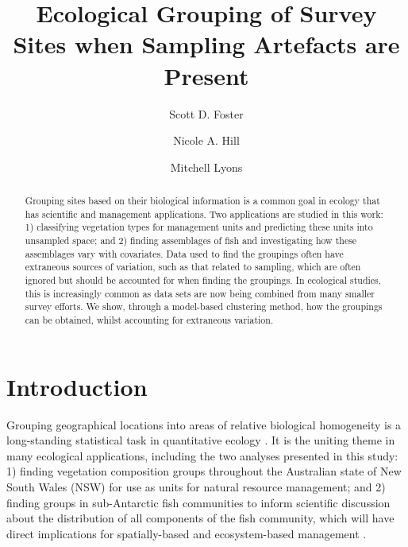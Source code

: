 \documentclass{statsoc}
\title[Grouping With Survey Artefacts]{Ecological Grouping of Survey Sites when Sampling Artefacts are Present}
\author[Foster, Hill \& Lyons]{Scott D. Foster}
\author{Nicole A. Hill}
\author[Foster, Hill \& Lyons]{Mitchell Lyons}
\begin{document}
\maketitle


\begin{abstract}
Grouping sites based on their biological information is a common goal in ecology that has scientific and management applications. Two applications are studied in this work: 1) classifying vegetation types for management units and predicting these units into unsampled space; and 2) finding assemblages of fish and investigating how these assemblages vary with covariates. Data used to find the groupings often have extraneous sources of variation, such as that related to sampling, which are often ignored but should be accounted for when finding the groupings. In ecological studies, this is increasingly common as data sets are now being combined from many smaller survey efforts. We show, through a model-based clustering method, how the groupings can be obtained, whilst accounting for extraneous variation.
\end{abstract}


\maketitle

\section{Introduction}\label{s:intro}

Grouping geographical locations into areas of relative biological homogeneity is a long-standing statistical task in quantitative ecology \citep[e.g.][]{qui02,man04}. It is the uniting theme in many ecological applications, including the two analyses presented in this study: 1) finding vegetation composition groups throughout the Australian state of New South Wales (NSW) for use as units for natural resource management; and 2) finding groups in sub-Antarctic fish communities to inform scientific discussion about the distribution of all components of the fish community, which will have direct implications for spatially-based and ecosystem-based management \cite{con11}.
\end{document}
